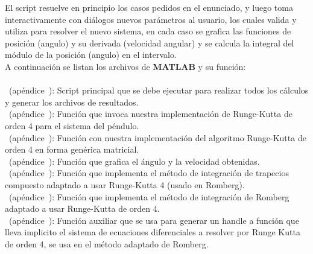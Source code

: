 
El script resuelve en principio los casos pedidos en el enunciado, y luego toma interactivamente con diálogos nuevos parámetros al usuario, los cuales valida y utiliza para resolver el nuevo sistema, en cada caso se grafica las funciones de posición (angulo) y su derivada (velocidad angular) y se calcula la integral del módulo de la posición (angulo) en el intervalo.\\


A continuación se listan los archivos de \textbf{MATLAB} y su función: \\\\


\textbf{}~(apéndice~): Script principal que se debe ejecutar para realizar todos los cálculos y generar los archivos de resultados.\\

\textbf{}~(apéndice~): Función que invoca nuestra implementación de Runge-Kutta de orden 4 para el sistema del péndulo.\\

\textbf{}~(apéndice~): Función con nuestra implementación del algoritmo Runge-Kutta de orden 4 en forma genérica matricial.\\

\textbf{}~(apéndice~): Función que grafica el ángulo y la velocidad obtenidas.\\

\textbf{}~(apéndice~): Función que implementa el método de integración de trapecios compuesto adaptado a usar Runge-Kutta 4 (usado en Romberg).\\

\textbf{}~(apéndice~): Función que implementa el método de integración de Romberg adaptado a usar Runge-Kutta de orden 4.\\

\textbf{}~(apéndice~): Función auxiliar que se usa para generar un handle a función que lleva implicito el sistema de ecuaciones diferenciales a resolver por Runge Kutta de orden 4, se usa en el método adaptado de Romberg.\\




